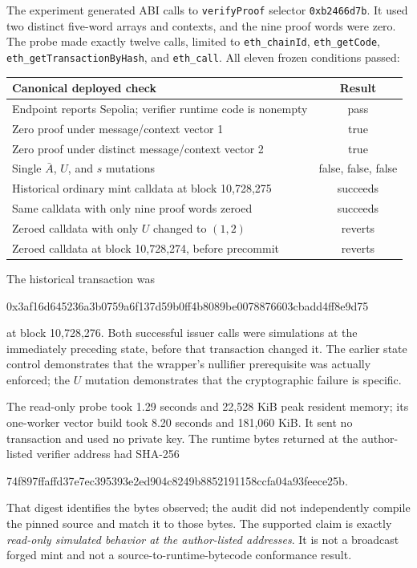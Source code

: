 \documentclass[10pt,a4paper]{article}
\begin{document}
The experiment generated ABI calls to
\texttt{verifyProof} selector \texttt{0xb2466d7b}. It used two distinct
five-word arrays and contexts, and the nine proof words were zero. The probe
made exactly twelve calls, limited to \texttt{eth\_chainId},
\texttt{eth\_getCode}, \texttt{eth\_getTransactionByHash}, and
\texttt{eth\_call}. All eleven frozen conditions passed:

\begin{center}
\begin{tabularx}{\textwidth}{@{}Xc@{}}
\toprule
Canonical deployed check & Result \\
\midrule
Endpoint reports Sepolia; verifier runtime code is nonempty & pass \\
Zero proof under message/context vector 1 & true \\
Zero proof under distinct message/context vector 2 & true \\
Single $\bar A$, $U$, and $s$ mutations & false, false, false \\
Historical ordinary mint calldata at block 10,728,275 & succeeds \\
Same calldata with only nine proof words zeroed & succeeds \\
Zeroed calldata with only $U$ changed to $(1,2)$ & reverts \\
Zeroed calldata at block 10,728,274, before precommit & reverts \\
\bottomrule
\end{tabularx}
\end{center}

The historical transaction was
\begin{center}
\small\ttfamily
0x3af16d645236a3b0759a6f137d59b0ff4b8089be0078876603cbadd4ff8e9d75
\end{center}
at block 10,728,276. Both successful issuer calls were simulations at the
immediately preceding state, before that transaction changed it. The earlier
state control demonstrates that the wrapper's nullifier prerequisite was
actually enforced; the $U$ mutation demonstrates that the cryptographic
failure is specific.

The read-only probe took 1.29 seconds and 22,528 KiB peak resident memory; its
one-worker vector build took 8.20 seconds and 181,060 KiB. It sent no
transaction and used no private key. The runtime bytes returned at the
author-listed verifier address had SHA-256
\begin{center}
\small\ttfamily
74f897ffaffd37e7ec395393e2ed904c8249b8852191158ccfa04a93feece25b.
\end{center}
That digest identifies the bytes observed; the audit did not independently
compile the pinned source and match it to those bytes. The supported claim is
exactly \emph{read-only simulated behavior at the author-listed addresses}.
It is not a broadcast forged mint and not a source-to-runtime-bytecode
conformance result.
\end{document}
